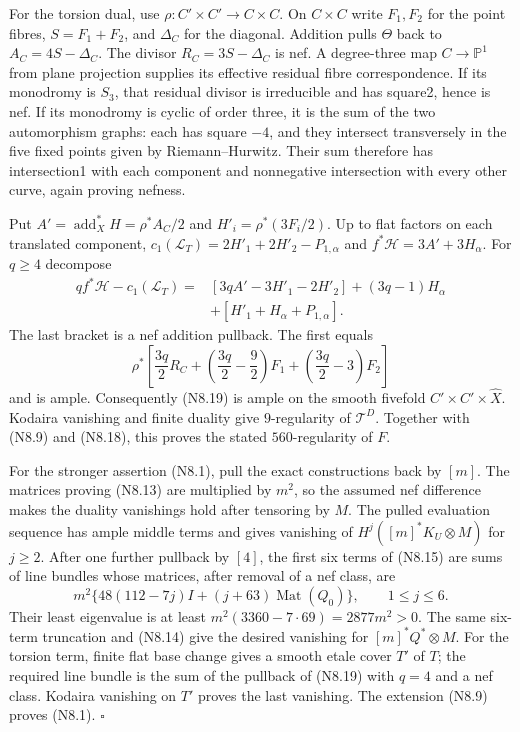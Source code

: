 For the torsion dual, use $\rho:C'\times C'\to C\times C$.
On $C\times C$ write $F_1,F_2$ for the point fibres,
$S=F_1+F_2$, and $\Delta_C$ for the diagonal. Addition pulls
$\Theta$ back to $A_C=4S-\Delta_C$. The divisor
$R_C=3S-\Delta_C$ is nef. A degree-three map $C\to\mathbb P^1$
from plane projection supplies its effective residual fibre
correspondence. If its monodromy is $S_3$, that residual divisor
is irreducible and has square2, hence is nef. If its monodromy
is cyclic of order three, it is the sum of the two automorphism
graphs: each has square $-4$, and they intersect transversely
in the five fixed points given by Riemann--Hurwitz. Their sum
therefore has intersection1 with each component and nonnegative
intersection with every other curve, again proving nefness.

Put $A'=\operatorname{add}_X^*H=\rho^*A_C/2$ and
$H'_i=\rho^*(3F_i/2)$. Up to flat factors on each translated
component,
$c_1(\mathcal L_T)=2H'_1+2H'_2-P_{1,\alpha}$ and
$f^*\mathcal H=3A'+3H_\alpha$. For $q\ge4$ decompose
\[
 \begin{split}
 qf^*\mathcal H-c_1(\mathcal L_T)
 ={}&[3qA'-3H'_1-2H'_2]+(3q-1)H_\alpha\\
    &+[H'_1+H_\alpha+P_{1,\alpha}].
 \end{split}                                               \tag{N8.19}
\]
The last bracket is a nef addition pullback. The first equals
\[
 \rho^*\left[\frac{3q}{2}R_C+
       \left(\frac{3q}{2}-\frac92\right)F_1+
       \left(\frac{3q}{2}-3\right)F_2\right]
\]
and is ample. Consequently (N8.19) is ample on the smooth
fivefold $C'\times C'\times\widehat X$. Kodaira vanishing and
finite duality give $9$-regularity of $\mathcal T^D$.
Together with (N8.9) and (N8.18), this proves the stated
$560$-regularity of $F$.

For the stronger assertion (N8.1), pull the exact constructions
back by $[m]$. The matrices proving (N8.13) are multiplied by
$m^2$, so the assumed nef difference makes the duality
vanishings hold after tensoring by $M$. The pulled evaluation
sequence has ample middle terms and gives vanishing of
$H^j([m]^*K_U\otimes M)$ for $j\ge2$.
After one further pullback by $[4]$, the first six terms of
(N8.15) are sums of line bundles whose matrices, after removal
of a nef class, are
\[
 m^2\{48(112-7j)I+(j+63)\operatorname{Mat}(Q_0)\},
 \qquad1\le j\le6.
\]
Their least eigenvalue is at least
$m^2(3360-7\cdot69)=2877m^2>0$. The same six-term truncation
and (N8.14) give the desired vanishing for $[m]^*Q^*\otimes M$.
For the torsion term, finite flat base change gives a smooth
etale cover $T'$ of $T$; the required line bundle is the sum
of the pullback of (N8.19) with $q=4$ and a nef class.
Kodaira vanishing on $T'$ proves the last vanishing.
The extension (N8.9) proves (N8.1). \hfill$\square$

